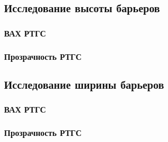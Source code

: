 \subsection{Исследование высоты барьеров}
\subsubsection{ВАХ РТГС}
\subsubsection{Прозрачность РТГС}

\subsection{Исследование ширины барьеров}
\subsubsection{ВАХ РТГС}
\subsubsection{Прозрачность РТГС}